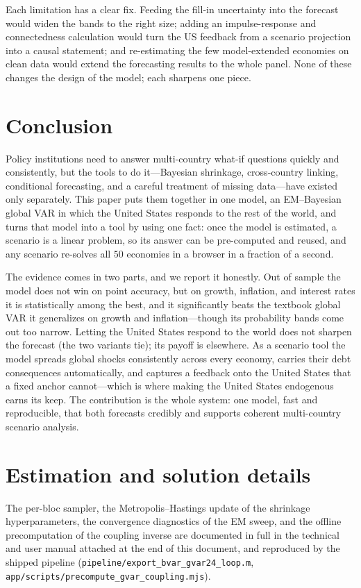 \documentclass[11pt]{article}
\newcommand{\code}[1]{\texttt{\small #1}}
\begin{document}
Each limitation has a clear fix. Feeding the fill-in uncertainty into the forecast would widen the bands
to the right size; adding an impulse-response and connectedness calculation would turn the US feedback
from a scenario projection into a causal statement; and re-estimating the few model-extended economies on
clean data would extend the forecasting results to the whole panel. None of these changes the design of
the model; each sharpens one piece.

\section{Conclusion}
\label{sec:conclusion}

Policy institutions need to answer multi-country what-if questions quickly and consistently, but the tools
to do it---Bayesian shrinkage, cross-country linking, conditional forecasting, and a careful treatment of
missing data---have existed only separately. This paper puts them together in one model, an EM--Bayesian
global VAR in which the United States responds to the rest of the world, and turns that model into a tool
by using one fact: once the model is estimated, a scenario is a linear problem, so its answer can be
pre-computed and reused, and any scenario re-solves all $50$ economies in a browser in a fraction of a
second.

The evidence comes in two parts, and we report it honestly. Out of sample the model does not win on point
accuracy, but on growth, inflation, and interest rates it is statistically among the best, and it
significantly beats the textbook global VAR it generalizes on growth and inflation---though its
probability bands come out too narrow. Letting the United States respond to the world does not sharpen the
forecast (the two variants tie); its payoff is elsewhere. As a scenario tool the model spreads global
shocks consistently across every economy, carries their debt consequences automatically, and captures a
feedback onto the United States that a fixed anchor cannot---which is where making the United States
endogenous earns its keep. The contribution is the whole system: one model, fast and reproducible, that
both forecasts credibly and supports coherent multi-country scenario analysis.

\appendix
\section{Estimation and solution details}
\label{app:estimation}
The per-bloc sampler, the Metropolis--Hastings update of the shrinkage hyperparameters, the convergence
diagnostics of the EM sweep, and the offline precomputation of the coupling inverse are documented in full
in the technical and user manual attached at the end of this document, and reproduced by the shipped
pipeline (\code{pipeline/export\_bvar\_gvar24\_loop.m}, \code{app/scripts/precompute\_gvar\_coupling.mjs}).
\end{document}
